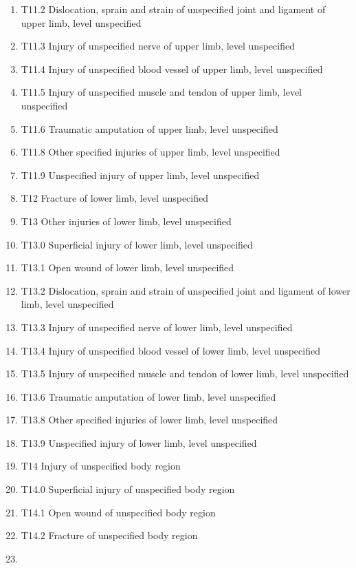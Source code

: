 \documentclass[
]{scrartcl}
\begin{document}
\begin{itemize}
\begin{enumerate}
  \item
    T11.2 Dislocation, sprain and strain of unspecified joint and
    ligament of upper limb, level unspecified
  \item
    T11.3 Injury of unspecified nerve of upper limb, level unspecified
  \item
    T11.4 Injury of unspecified blood vessel of upper limb, level
    unspecified
  \item
    T11.5 Injury of unspecified muscle and tendon of upper limb, level
    unspecified
  \item
    T11.6 Traumatic amputation of upper limb, level unspecified
  \item
    T11.8 Other specified injuries of upper limb, level unspecified
  \item
    T11.9 Unspecified injury of upper limb, level unspecified
  \item
    T12 Fracture of lower limb, level unspecified
  \item
    T13 Other injuries of lower limb, level unspecified
  \item
    T13.0 Superficial injury of lower limb, level unspecified
  \item
    T13.1 Open wound of lower limb, level unspecified
  \item
    T13.2 Dislocation, sprain and strain of unspecified joint and
    ligament of lower limb, level unspecified
  \item
    T13.3 Injury of unspecified nerve of lower limb, level unspecified
  \item
    T13.4 Injury of unspecified blood vessel of lower limb, level
    unspecified
  \item
    T13.5 Injury of unspecified muscle and tendon of lower limb, level
    unspecified
  \item
    T13.6 Traumatic amputation of lower limb, level unspecified
  \item
    T13.8 Other specified injuries of lower limb, level unspecified
  \item
    T13.9 Unspecified injury of lower limb, level unspecified
  \item
    T14 Injury of unspecified body region
  \item
    T14.0 Superficial injury of unspecified body region
  \item
    T14.1 Open wound of unspecified body region
  \item
    T14.2 Fracture of unspecified body region
  \item

\end{enumerate}
\end{itemize}
\end{document}
